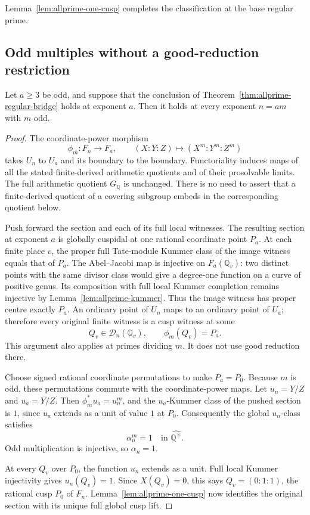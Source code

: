Lemma~\ref{lem:allprime-one-cusp} completes the classification at
the base regular prime.

\subsection{Odd multiples without a good-reduction restriction}

\begin{proposition}
\label{prop:allprime-odd-transfer}
Let \(a\geq3\) be odd, and suppose that the conclusion of
Theorem~\ref{thm:allprime-regular-bridge} holds at exponent \(a\).
Then it holds at every exponent \(n=am\) with \(m\) odd.
\end{proposition}

\begin{proof}
The coordinate-power morphism
\[
 \phi_m:F_n\longrightarrow F_a,\qquad
 (X:Y:Z)\longmapsto(X^m:Y^m:Z^m)
\]
takes \(U_n\) to \(U_a\) and its boundary to the boundary.
Functoriality induces maps of all the stated finite-derived
arithmetic quotients and of their prosolvable limits.
The full arithmetic quotient \(G_{\mathbb Q}\) is unchanged.
There is no need to assert that a finite-derived quotient of a
covering subgroup embeds in the corresponding quotient below.

Push forward the section and each of its full local witnesses.
The resulting section at exponent \(a\) is globally cuspidal at
one rational coordinate point \(P_a\).
At each finite place \(v\), the proper full Tate-module Kummer
class of the image witness equals that of \(P_a\).
The Abel--Jacobi map is injective on \(F_a(\mathbb Q_v)\):
two distinct points with the same divisor class would give a
degree-one function on a curve of positive genus.
Its composition with full local Kummer completion remains
injective by Lemma~\ref{lem:allprime-kummer}.
Thus the image witness has proper centre exactly \(P_a\).
An ordinary point of \(U_n\) maps to an ordinary point of
\(U_a\); therefore every original finite witness is a cusp
witness at some
\[
 Q_v\in\mathcal D_n(\mathbb Q_v),\qquad \phi_m(Q_v)=P_a.
\]
This argument also applies at primes dividing \(m\).
It does not use good reduction there.

Choose signed rational coordinate permutations to make
\(P_a=P_0\).
Because \(m\) is odd, these permutations commute with the
coordinate-power maps.
Let \(u_n=Y/Z\) and \(u_a=Y/Z\).
Then \(\phi_m^*u_a=u_n^m\), and the \(u_a\)-Kummer class of the
pushed section is \(1\), since \(u_a\) extends as a unit of
value \(1\) at \(P_0\).
Consequently the global \(u_n\)-class satisfies
\[
 \alpha_n^m=1\quad\text{in }\widehat{\mathbb Q^\times}.
\]
Odd multiplication is injective, so \(\alpha_n=1\).

At every \(Q_v\) over \(P_0\), the function \(u_n\) extends as
a unit.  Full local Kummer injectivity gives \(u_n(Q_v)=1\).
Since \(X(Q_v)=0\), this says
\(Q_v=(0:1:1)\), the rational cusp \(P_0\) of \(F_n\).
Lemma~\ref{lem:allprime-one-cusp} now identifies the original
section with its unique full global cusp lift.
\end{proof}

